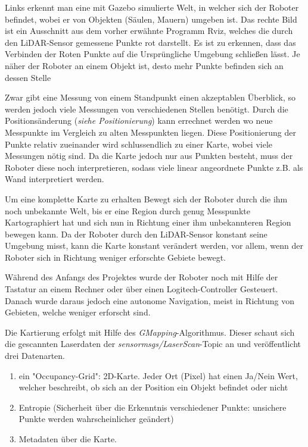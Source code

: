 {{		Links erkennt man eine mit Gazebo simulierte Welt, in welcher sich der Roboter befindet, wobei er von Objekten (Säulen, Mauern) umgeben ist. Das rechte Bild ist ein Ausschnitt aus dem vorher erwähnte Programm Rviz, welches die durch den LiDAR-Sensor gemessene Punkte rot darstellt. Es ist zu erkennen, dass das Verbinden der Roten Punkte auf die Ursprüngliche Umgebung schließen lässt. Je näher der Roboter an einem Objekt ist, desto mehr Punkte befinden sich an dessen Stelle
		
		Zwar gibt eine Messung von einem Standpunkt einen akzeptablen Überblick, so werden jedoch viele Messungen von verschiedenen Stellen benötigt. Durch die Positionsänderung (\textit{siehe Positionierung}) kann errechnet werden wo neue Messpunkte im Vergleich zu alten Messpunkten liegen. Diese Positionierung der Punkte relativ zueinander wird schlussendlich zu einer Karte, wobei viele Messungen nötig sind. Da die Karte jedoch nur aus Punkten besteht, muss der Roboter diese noch interpretieren, sodass viele linear angeordnete Punkte z.B. als Wand interpretiert werden.
		
		Um eine komplette Karte zu erhalten Bewegt sich der Roboter durch die ihm noch unbekannte Welt, bis er eine Region durch genug Messpunkte Kartographiert hat und sich nun in Richtung einer ihm unbekannteren Region bewegen kann. Da der Roboter durch den LiDAR-Sensor konstant seine Umgebung misst, kann die Karte konstant verändert werden, vor allem, wenn der Roboter sich in Richtung weniger erforschte Gebiete bewegt.
		
		Während des Anfangs des Projektes wurde der Roboter noch mit Hilfe der Tastatur an einem Rechner oder über einen Logitech-Controller Gesteuert. Danach wurde daraus jedoch eine autonome Navigation, meist in Richtung von Gebieten, welche weniger erforscht sind. 
		
		Die Kartierung erfolgt mit Hilfe des \emph{GMapping}-Algorithmus. Dieser schaut sich die gescannten Laserdaten der \emph{sensor\textunderscore msgs/LaserScan}-Topic an und veröffentlicht drei Datenarten.
		\begin{enumerate}
			\item ein "Occupancy-Grid": 2D-Karte. Jeder Ort (Pixel) hat einen Ja/Nein Wert, welcher beschreibt, ob sich an der Position ein Objekt befindet oder nicht
			\item Entropie (Sicherheit über die Erkenntnis verschiedener Punkte: unsichere Punkte werden wahrscheinlicher geändert)
			\item Metadaten über die Karte.
		\end{enumerate}
		
}}
